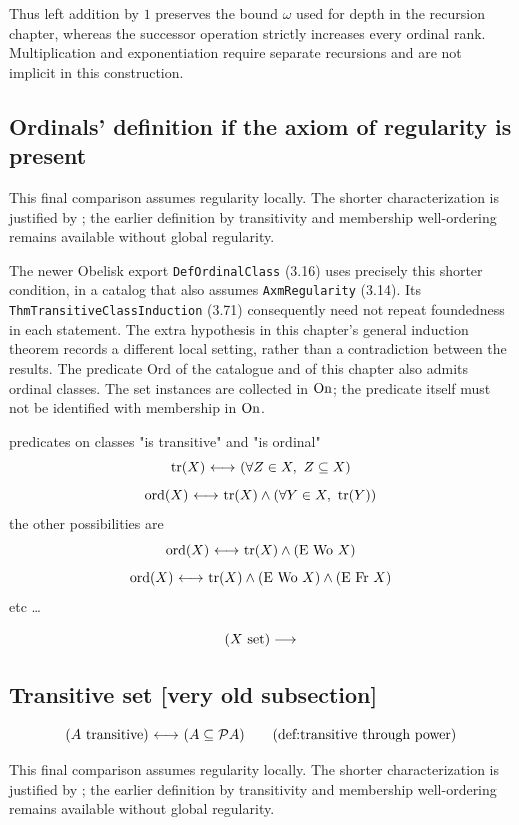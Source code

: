 Thus left addition by $1$ preserves the bound $\omega$ used for depth
in the recursion chapter, whereas the successor operation strictly
increases every ordinal rank. Multiplication and exponentiation require
separate recursions and are not implicit in this construction.

\subsection{Ordinals' definition if the axiom of regularity is present}
This final comparison assumes regularity locally. The shorter
characterization is justified by ; the earlier
definition by transitivity and membership well-ordering remains available
without global regularity.

The newer Obelisk export \texttt{DefOrdinalClass} (3.16) uses precisely
this shorter condition, in a catalog that also assumes
\texttt{AxmRegularity} (3.14). Its \texttt{ThmTransitiveClassInduction}
(3.71) consequently need not repeat foundedness in each statement.
The extra hypothesis in this chapter's general induction theorem records
a different local setting, rather than a contradiction between the results.
The predicate $\mathrm{Ord}$ of the catalogue and of this chapter also
admits ordinal classes. The set instances are collected in $\mathrm{On}$; the
predicate itself must not be identified with membership in $\mathrm{On}$.
\begin{definition} predicates on classes "is transitive" and "is ordinal"
\[
\mathrm{tr}(X) {\ \longleftrightarrow\ } (\forall Z\in X,\ Z\subseteq X)
\]
\[
\mathrm{ord}(X) {\ \longleftrightarrow\ } \mathrm{tr}(X)\land (\forall Y\in X,\ \mathrm{tr}(Y))
\]
the other possibilities are
\[
\mathrm{ord}(X) {\ \longleftrightarrow\ } \mathrm{tr}(X)\land (\mbox{E Wo }X)
\]
\[
\mathrm{ord}(X) {\ \longleftrightarrow\ } \mathrm{tr}(X)\land (\mbox{E Wo }X)\land (\mbox{E Fr }X)
\]
etc \dots
\end{definition}

\iffalse
\[
(X \mathrm{\ set})
\longrightarrow
\]

\subsection{Transitive set [very old subsection]}
\begin{definition}
\[
(A \transitive)\iff (A\subclass \power A)
\labeltagd{def}{transitive through power}
\]
\end{definition}

This final comparison assumes regularity locally. The shorter
characterization is justified by ; the earlier
definition by transitivity and membership well-ordering remains available
without global regularity.

